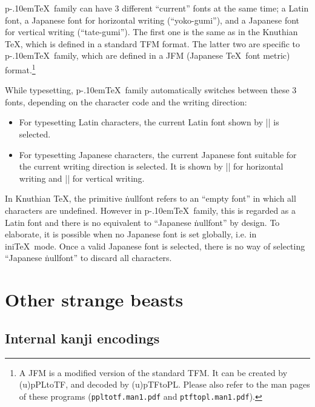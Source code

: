 \documentclass[a4paper,11pt]{article}
\let\emph=\origemph
\def\code#1{\texttt{#1}}
\def\pTeX{p\kern-.10em\TeX}
\begin{document}
\pTeX\ family can have 3 different ``current'' fonts at the same time;
a Latin font, a Japanese font for horizontal writing (``yoko-gumi''),
and a Japanese font for vertical writing (``tate-gumi'').
The first one is the same as in the Knuthian \TeX,
which is defined in a standard TFM format.
The latter two are specific to \pTeX\ family, which are defined
in a JFM (Japanese \TeX\ font metric) format.\footnote{%
A JFM is a modified version of the standard TFM.
It can be created by (u)pPLtoTF, and decoded by (u)pTFtoPL.
Please also refer to the man pages of these programs
(\code{ppltotf.man1.pdf} and \code{ptftopl.man1.pdf}).}

While typesetting, \pTeX\ family automatically switches between
these 3 fonts, depending on the character code and the writing direction:
\begin{itemize}
  \item For typesetting Latin characters,
    the current Latin font shown by |\the\font| is selected.
  \item For typesetting Japanese characters,
    the current Japanese font suitable for the current writing direction
    is selected. It is shown by |\the\jfont| for horizontal writing
    and |\the\tfont| for vertical writing.
\end{itemize}

In Knuthian \TeX, the primitive \.{nullfont} refers to an ``empty font''
in which all characters are undefined.
However in \pTeX\ family, this is regarded as a Latin font
and there is no equivalent to ``Japanese \.{nullfont}'' by design.
To elaborate, it is possible \emph{only} when no Japanese font is
set globally, i.e. in ini\TeX\ mode.
Once a valid Japanese font is selected, there is no way of
selecting ``Japanese \.{nullfont}'' to discard all characters.

\section{Other strange beasts}


\subsection{Internal kanji encodings}\label{kanji-internal}
\end{document}

